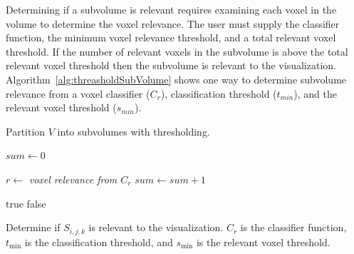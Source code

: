 \documentclass[journal]{vgtc}                %
\begin{document}
Determining if a subvolume is relevant requires examining each voxel in the
volume to determine the voxel relevance. The user must supply the classifier
function, the minimum voxel relevance threshold, and a total relevant voxel
threshold. If the number of relevant voxels in the subvolume is above the total
relevant voxel threshold then the subvolume is relevant to the visualization.
Algorithm~\ref{alg:threasholdSubVolume} shows one way to determine subvolume
relevance from a voxel classifier ($C_{r}$), classification threshold ($t_{min}$),
and the relevant voxel threshold ($s_{min}$).

\begin{algorithm}[]
	\begin{algorithmic}[1]  
		   
		\State {} 
		\EndIf
		\EndFor
		\EndFor
		\EndFor
		\EndProcedure
	\end{algorithmic}
	\caption{Partition $V$ into subvolumes with thresholding.}
	\label{alg:partitionAndThreshold}
\end{algorithm}



\begin{algorithm}[]
	\begin{algorithmic}[1]
		\State $sum \gets 0$  
		
		
		\State $r \gets$ \textit{voxel relevance from $C_{r}$} 
		\State $sum \gets sum + 1$  
		\EndIf
		\EndFor
		
		\State \Return true 
		\Else
		\State \Return false 
		\EndIf
		\EndProcedure
	\end{algorithmic}
	\caption{Determine if $S_{i,j,k}$ is relevant to the visualization. $C_r$ is the classifier function,
		$t_{\min}$ is the classification threshold, and $s_{\min}$ is the relevant voxel threshold.}
	\label{alg:threasholdSubVolume}
\end{algorithm}

\end{document}
